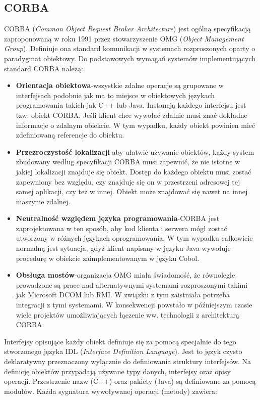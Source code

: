 \subsection{CORBA}
CORBA (\textit{Common Object Request Broker Architecture}) jest ogólną specyfikacją zaproponowaną w roku 1991 przez stowarzyszenie OMG (\textit{Object Management Group}). Definiuje ona standard komunikacji w systemach rozproszonych oparty o paradygmat obiektowy. Do podstawowych wymagań\cite{bolton2002pure} systemów implementujących standard CORBA należą:
\begin{itemize}
  \item \textbf{Orientacja obiektowa}-wszystkie zdalne operacje są grupowane w interfejsach podobnie jak ma to miejsce w obiektowych językach programowania takich jak C++ lub Java. Instancją każdego interfejsu jest tzw. obiekt CORBA\@. Jeśli klient chce wywołać zdalnie musi znać dokładne informacje o zdalnym obiekcie. W tym wypadku, każdy obiekt powinien mieć zdefiniowaną referencje do obiektu.
  \item \textbf{Przezroczystość lokalizacji}-aby ułatwić używanie obiektów, każdy system zbudowany według specyfikacji CORBA musi zapewnić, że nie istotne w jakiej lokalizacji znajduje się obiekt. Dostęp do każdego obiektu musi zostać zapewniony bez względu, czy znajduje się on w przestrzeni adresowej tej samej aplikacji, czy też w innej. Obiekt może znajdować się nawet na innej maszynie zdalnej.
  \item \textbf{Neutralność względem języka programowania}-CORBA jest zaprojektowana w ten sposób, aby kod klienta i serwera mógł zostać utworzony w różnych językach oprogramowania. W tym wypadku całkowicie normalną jest sytuacja, gdyż klient napisany w języku Java wywołuje procedurę w obiekcie zaimplementowanym w języku Cobol.
  \item \textbf{Obsługa mostów}-organizacja OMG miała świadomość, że równolegle prowadzone są prace nad alternatywnymi systemami rozproszonymi takimi jak Microsoft DCOM lub RMI\@. W związku z tym zaistniała potrzeba integracji z tymi systemami. W konsekwencji powstało w późniejszym czasie wiele projektów umożliwiających łączenie ww. technologii z architekturą CORBA\@.
\end{itemize}
Interfejsy opisujące każdy obiekt definiuje się za pomocą specjalnie do tego stworzonego języka IDL (\textit{Interface Definition Language}). Jest to język czysto deklaratywny przeznaczony wyłącznie do definiowania struktury interfejsów. Na definicję obiektów przypadają używane typy danych, interfejsy oraz opisy operacji. Przestrzenie nazw (C++) oraz pakiety (Java) są definiowane za pomocą modułów. Każda sygnatura wywoływanej operacji (metody) zawiera:
